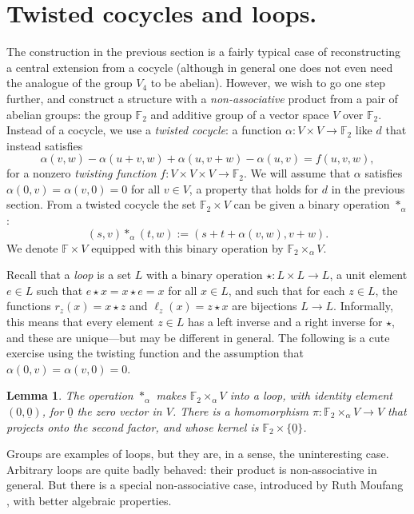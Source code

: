 \documentclass{article}
\theoremstyle{plain}
\newtheorem{lemma}{Lemma}
\theoremstyle{definition}
\def \FF {\mathbb{F}}
\begin{document}
\section{Twisted cocycles and loops.}

The construction in the previous section is a fairly typical case of reconstructing a central extension from a cocycle (although in general one does not even need the analogue of the group $V_4$ to be abelian). 
However, we wish to go one step further, and construct a structure with a \emph{non-associative} product from a pair of abelian groups: the group $\FF_2$ and additive group of a vector space $V$ over $\FF_2$.
Instead of a cocycle, we use a \emph{twisted cocycle}: a function $\alpha\colon V\times V \to \FF_2$ like $d$ that instead satisfies
\[
	\alpha(v,w)-\alpha(u+v,w)+\alpha(u,v+w)-\alpha(u,v) = f(u,v,w),
\]
for a nonzero \emph{twisting function} $f\colon V\times V\times V \to \FF_2$. We will assume that $\alpha$ satisfies $\alpha(0,v)=\alpha(v,0) = 0$ for all $v\in V$, a property that holds for $d$ in the previous section. From a twisted cocycle the set $\FF_2 \times V$ can be given a binary operation $\ast_\alpha$:
\[
	(s,v)\ast_\alpha(t,w):=(s+ t+ \alpha(v,w),v+w).
\]
We denote $\FF \times V$ equipped with this binary operation by $\FF_2\times_\alpha V$.

Recall that a \emph{loop} is a set $L$ with a binary operation $\star\colon L\times L \to L$, a unit element $e\in L$ such that $e\star x = x \star e = x$ for all $x\in L$, and such that for each $z\in L$, the functions $r_z(x) = x \star z$ and $\ell_z(x)=z\star x$ are bijections $L\to L$. 
Informally, this means that every element $z\in L$ has a left inverse and a right inverse for $\star$, and these are unique---but may be different in general. 
The following is a cute exercise using the twisting function and the assumption that $\alpha(0,v)=\alpha(v,0)=0$.

\begin{lemma}
The operation $\ast_\alpha$ makes $\FF_2\times_\alpha V$ into a loop, with identity element $(0,\underline{0})$, for $\underline{0}$ the zero vector in $V$.
There is a homomorphism $\pi\colon \FF_2\times_\alpha V \to V$ that projects onto the second factor, and whose kernel is $\FF_2 \times\{\underline{0}\}$.
\end{lemma}

Groups are examples of loops, but they are, in a sense, the uninteresting case. 
Arbitrary loops are quite badly behaved: their product is non-associative in general. 
But there is a special non-associative case, introduced by Ruth Moufang \cite{Moufang}, with better algebraic properties.
\end{document}
